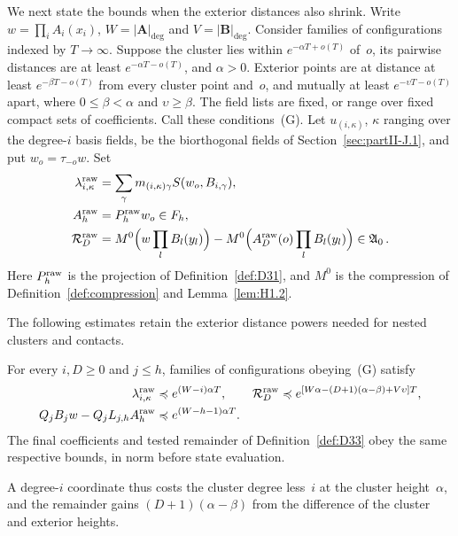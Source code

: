 We next state the bounds when the exterior distances also shrink. Write $w=\prod_i A_i(x_i)$, $W=|\boldsymbol A|_{\deg}$ and $V=|\boldsymbol B|_{\deg}$. Consider families of configurations indexed by $T\to\infty$. Suppose the cluster lies within $e^{-\alpha T+o(T)}$ of~$o$, its pairwise distances are at least $e^{-\alpha T-o(T)}$, and $\alpha>0$. Exterior points are at distance at least $e^{-\beta T-o(T)}$ from every cluster point and~$o$, and mutually at least $e^{-\upsilon T-o(T)}$ apart, where $0\le\beta<\alpha$ and $\upsilon\ge\beta$. The field lists are fixed, or range over fixed compact sets of coefficients. Call these conditions~(G). Let $u_{(i,\kappa)}$, $\kappa$ ranging over the degree-$i$ basis fields, be the biorthogonal fields of Section~\ref{sec:partII-J.1}, and put $w_o=\tau_{-o}w$. Set
\begin{align*}
\lambda_{i,\kappa}^{\rm raw}&=\sum_\gamma m_{(i,\kappa)\gamma}S(w_o,B_{i,\gamma}),\\
A^{\rm raw}_h&=P_h^{\rm raw}w_o\in F_h,\\
\mathcal R_D^{\rm raw}&=M^0\Bigl(w\prod_lB_l(y_l)\Bigr)
 -M^0\Bigl(A^{\rm raw}_D(o)\prod_lB_l(y_l)\Bigr)\in\mathfrak A_0\,.
\end{align*}
Here $P_h^{\rm raw}$ is the projection of Definition~\ref{def:D31}, and $M^0$ is the compression of Definition~\ref{def:compression} and Lemma~\ref{lem:H1.2}.

The following estimates retain the exterior distance powers needed for nested clusters and contacts.
\begin{samepage}
\begin{lemma}\label{lem:J-power-separated}
For every $i,D\ge0$ and $j\le h$, families of configurations obeying~(G) satisfy
\begin{align}
\lambda_{i,\kappa}^{\rm raw}&\preccurlyeq e^{(W-i)\alpha T},&
\mathcal R_D^{\rm raw}&\preccurlyeq e^{[W\alpha-(D+1)(\alpha-\beta)+V\upsilon]T},\label{eq:J-raw-rates}\\
Q_jB_jw-Q_jL_{j,h}A^{\rm raw}_h&\preccurlyeq e^{(W-h-1)\alpha T}.&&\label{eq:J-average-error}
\end{align}
The final coefficients and tested remainder of Definition~\ref{def:D33} obey the same respective bounds, in norm before state evaluation.
\end{lemma}
\end{samepage}
A degree-$i$ coordinate thus costs the cluster degree less~$i$ at the cluster height~$\alpha$, and the remainder gains $(D+1)(\alpha-\beta)$ from the difference of the cluster and exterior heights.

